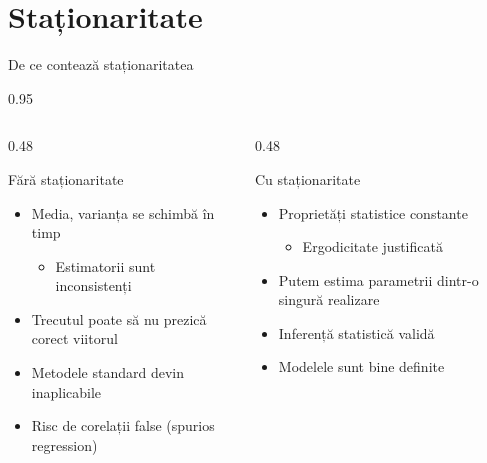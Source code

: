 \documentclass[9pt, aspectratio=169, t]{beamer}
\begin{document}
\section{Staționaritate}

\begin{frame}{De ce contează staționaritatea}
    \begin{cminipage}{0.95\textwidth}
        \vspace{-0.2cm}
        \begin{columns}[T]
            \begin{column}{0.48\textwidth}
                \begin{alertblock}{Fără staționaritate}
                    \begin{itemize}\setlength{\itemsep}{0pt}
                        \item Media, varianța se schimbă în timp
                        \begin{itemize}
                            \item Estimatorii sunt inconsistenți
                        \end{itemize}
                        \item Trecutul poate să nu prezică corect viitorul
                        \item Metodele standard devin inaplicabile
                        \item Risc de corelații false (spurios regression)
                    \end{itemize}
                \end{alertblock}
            \end{column}
            \begin{column}{0.48\textwidth}
                \begin{exampleblock}{Cu staționaritate}
                    \begin{itemize}\setlength{\itemsep}{0pt}
                        \item Proprietăți statistice constante
                        \begin{itemize}
                            \item Ergodicitate justificată
                        \end{itemize}
                        \item Putem estima parametrii dintr-o singură realizare
                        \item Inferență statistică validă
                        \item Modelele sunt bine definite
                    \end{itemize}
                \end{exampleblock}
            \end{column}
        \end{columns}


\end{cminipage}
\end{frame}
\end{document}
